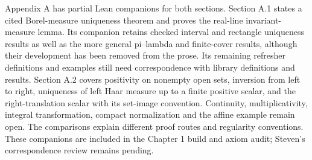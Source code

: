 Appendix A has partial Lean companions for both sections. Section A.1 states a cited Borel-measure uniqueness theorem and proves the real-line invariant-measure lemma. Its companion retains checked interval and rectangle uniqueness results as well as the more general pi--lambda and finite-cover results, although their development has been removed from the prose. Its remaining refresher definitions and examples still need correspondence with library definitions and results. Section A.2 covers positivity on nonempty open sets, inversion from left to right, uniqueness of left Haar measure up to a finite positive scalar, and the right-translation scalar with its set-image convention. Continuity, multiplicativity, integral transformation, compact normalization and the affine example remain open. The comparisons explain different proof routes and regularity conventions. These companions are included in the Chapter 1 build and axiom audit; Steven's correspondence review remains pending.
